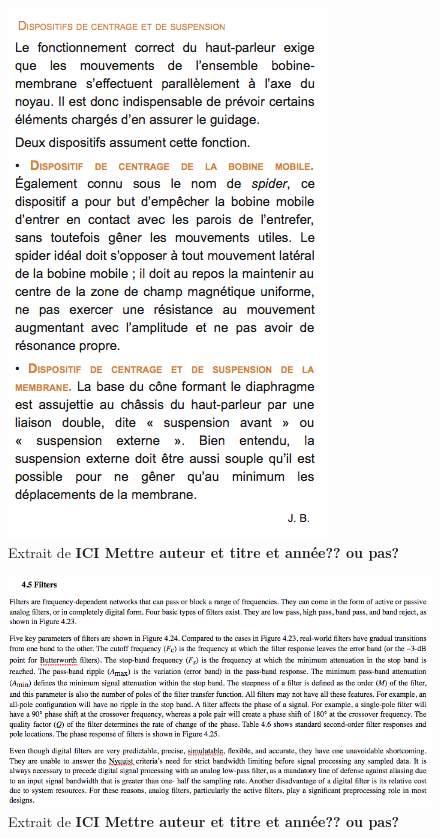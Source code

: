 \begin{figure}[b]
\begin{center}
\includegraphics{img/Larousse-1}
\end{center}
\caption{Extrait de \cite[p.~6486]{Larousse} \textbf{ICI Mettre auteur et titre et année?? ou pas?}} %
\label{Trace 4}
\end{figure}

\begin{figure}[b]
\begin{center}
\includegraphics{img/Kularatna-1}
\end{center}
\caption{Extrait de \cite[p.~249-251]{Kularatna}\textbf{ICI Mettre auteur et titre et année?? ou pas?}} %
\label{Trace 5}
\end{figure}

